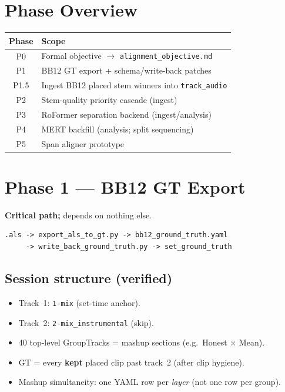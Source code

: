 \documentclass[11pt,a4paper]{article}
\begin{document}
\section{Phase Overview}

\begin{center}
\begin{tabular}{@{}cl@{}}
\toprule
Phase & Scope \\
\midrule
P0 & Formal objective $\to$ \texttt{alignment\_objective.md} \\
P1 & BB12 GT export + schema/write-back patches \\
P1.5 & Ingest BB12 placed stem winners into \texttt{track\_audio} \\
P2 & Stem-quality priority cascade (ingest) \\
P3 & RoFormer separation backend (ingest/analysis) \\
P4 & MERT backfill (analysis; split sequencing) \\
P5 & Span aligner prototype \\
\bottomrule
\end{tabular}
\end{center}

\section{Phase 1 --- BB12 GT Export}\label{sec:p1}

\textbf{Critical path;} depends on nothing else.

\begin{lstlisting}
.als -> export_als_to_gt.py -> bb12_ground_truth.yaml
     -> write_back_ground_truth.py -> set_ground_truth
\end{lstlisting}

\subsection{Session structure (verified)}

\begin{itemize}[noitemsep]
  \item Track~1: \texttt{1-mix} (set-time anchor).
  \item Track~2: \texttt{2-mix\_instrumental} (skip).
  \item 40 top-level GroupTracks = mashup sections (e.g.\ Honest $\times$ Mean).
  \item GT = every \textbf{kept} placed clip past track~2 (after clip hygiene).
  \item Mashup simultaneity: one YAML row per \emph{layer} (not one row per group).
\end{itemize}
\end{document}
